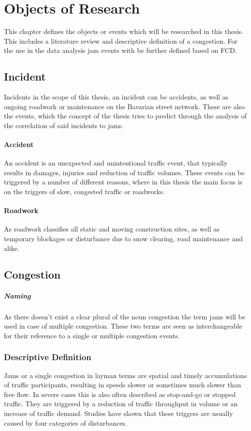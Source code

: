 \chapter{Objects of Research}
	This chapter defines the objects or events which will be researched in this thesis. This includes a literature review and descriptive definition of a congestion. For the use in the data analysis jam events with be further defined based on FCD.  

\section{Incident}
		Incidents in the scope of this thesis, an incident can be accidents, as well as ongoing roadwork or maintenance on the Bavarian street network. These are also the events, which the concept of the thesis tries to predict through the analysis of the correlation of said incidents to jams.
	\subsubsection{Accident}
		An accident is an unexpected and unintentional traffic event, that typically results in damages, injuries and reduction of traffic volumes. These events can be triggered by a number of different reasons, where in this thesis the main focus is on the triggers of slow, congested traffic or roadworks.
	\subsubsection{Roadwork}
		As roadwork classifies all static and moving construction sites, as well as temporary blockages or disturbance due to snow clearing, road maintenance and alike. 
	
\section{Congestion}
\label{definition_congestion}

\paragraph{Naming} As there doesn’t exist a clear plural of the noun congestion the term jams will be used in case of multiple congestion. These two terms are seen as interchangeable for their reference to a single or multiple congestion events.

\subsection{Descriptive Definition}
Jams or a single congestion in layman terms are spatial and timely accumulations of traffic participants, resulting in speeds slower or sometimes much slower than free flow. In severe cases this is also often described as stop-and-go or stopped traffic. They are triggered by a reduction of traffic throughput in volume or an increase of traffic demand. Studies have shown that these triggers are usually caused by four categories of disturbances. \parencite{TRB2003,FHA2011}

